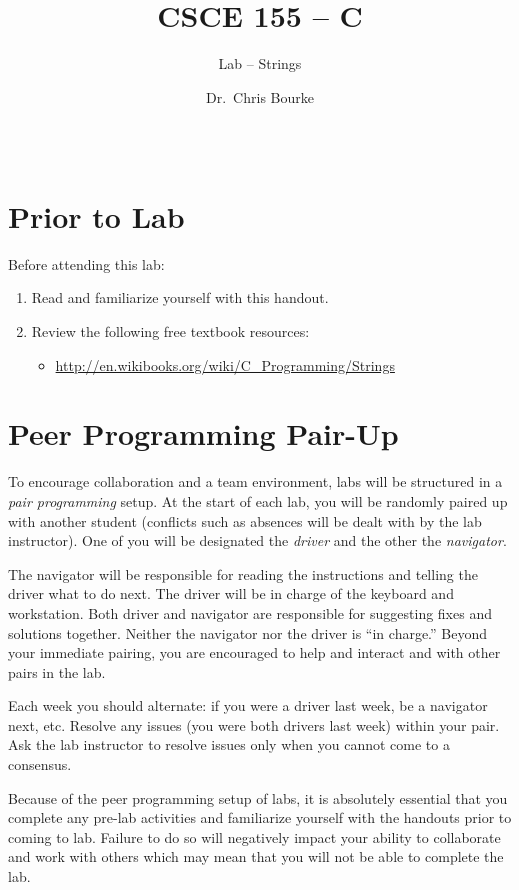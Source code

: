 \documentclass[12pt]{scrartcl}
\title{CSCE 155 -- C}
\subtitle{Lab -- Strings}
\author{Dr.\ Chris Bourke}
\date{~}
\begin{document}
\maketitle

\section*{Prior to Lab}

Before attending this lab:
\begin{enumerate}
  \item Read and familiarize yourself with this handout.
  \item Review the following free textbook resources:
	\begin{itemize}
  	  \item \url{http://en.wikibooks.org/wiki/C_Programming/Strings }
	\end{itemize}
\end{enumerate}

\section*{Peer Programming Pair-Up}

To encourage collaboration and a team environment, labs will be
structured in a \emph{pair programming} setup.  At the start of
each lab, you will be randomly paired up with another student 
(conflicts such as absences will be dealt with by the lab instructor).
One of you will be designated the \emph{driver} and the other
the \emph{navigator}.  

The navigator will be responsible for reading the instructions and
telling the driver what to do next.  The driver will be in charge of the
keyboard and workstation.  Both driver and navigator are responsible
for suggesting fixes and solutions together.  Neither the navigator
nor the driver is ``in charge.''  Beyond your immediate pairing, you
are encouraged to help and interact and with other pairs in the lab.

Each week you should alternate: if you were a driver last week, 
be a navigator next, etc.  Resolve any issues (you were both drivers
last week) within your pair.  Ask the lab instructor to resolve issues
only when you cannot come to a consensus.  

Because of the peer programming setup of labs, it is absolutely 
essential that you complete any pre-lab activities and familiarize
yourself with the handouts prior to coming to lab.  Failure to do
so will negatively impact your ability to collaborate and work with 
others which may mean that you will not be able to complete the
lab.  
\end{document}
